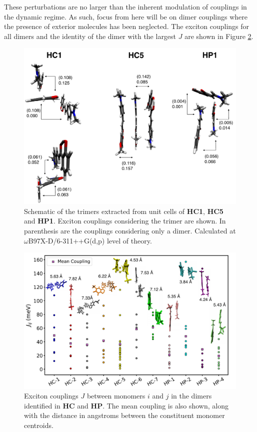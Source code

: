 These perturbations are no larger than the inherent modulation of couplings in the dynamic regime.\cite{Arago2015,Arago2016} As such, focus from here will be on dimer couplings where the presence of exterior molecules has been neglected. The exciton couplings for all dimers and the identity of the dimer with the largest $J$ are shown in Figure \ref{figure: couplings}. 
\begin{figure}[t]
\centering
  \includegraphics[width=0.8\linewidth]{5ConnectingCrystalStructure/trimer_couplings}
  \caption[Trimer exciton couplings]{Schematic of the trimers extracted from unit cells of \textbf{HC1}, \textbf{HC5} and \textbf{HP1}. Exciton couplings considering the trimer are shown. In parenthesis are the couplings considering only a dimer. Calculated at $\omega$B97X-D/6-311++G(d,p) level of theory.}
  \label{figure: trimer_couplings}
\end{figure}


\begin{figure}[t]
\centering
  \includegraphics[width=0.9\linewidth]{5ConnectingCrystalStructure/couplings}
  \caption[Exciton couplings in \textbf{HC} and \textbf{HP} systems]{Exciton couplings $J$ between monomers $i$ and $j$ in the dimers identified in \textbf{HC} and \textbf{HP}. The mean coupling is also shown, along with the distance in angstroms between the constituent monomer centroids.}
  \label{figure: couplings}
\end{figure}

